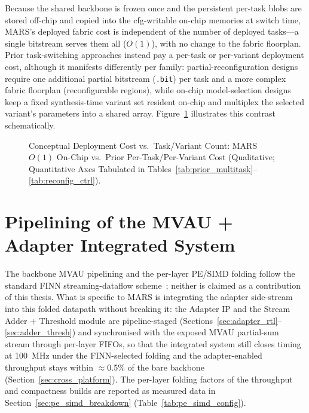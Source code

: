 \documentclass[12pt, a4paper]{report}
\numberwithin{equation}{chapter}
\numberwithin{figure}{chapter}
\numberwithin{table}{chapter}
\numberwithin{algorithm}{chapter}
\begin{document}
Because the shared backbone is frozen once and the persistent per-task blobs are stored off-chip and copied into the cfg-writable on-chip memories at switch time, MARS's deployed fabric cost is independent of the number of deployed tasks---a single bitstream serves them all ($O(1)$), with no change to the fabric floorplan. Prior task-switching approaches instead pay a per-task or per-variant deployment cost, although it manifests differently per family: partial-reconfiguration designs require one additional partial bitstream (\texttt{.bit}) per task and a more complex fabric floorplan (reconfigurable regions), while on-chip model-selection designs keep a fixed synthesis-time variant set resident on-chip and multiplex the selected variant's parameters into a shared array. Figure~\ref{fig:scaling_cost} illustrates this contrast schematically.

\begin{figure}[H]
\centering
{}
\caption[Conceptual Deployment Cost vs.\ Task/Variant Count]{Conceptual Deployment Cost vs.\ Task/Variant Count: MARS $O(1)$ On-Chip vs.\ Prior Per-Task/Per-Variant Cost (Qualitative; Quantitative Axes Tabulated in Tables~\ref{tab:prior_multitask}--\ref{tab:reconfig_ctrl}).}
\label{fig:scaling_cost}
\end{figure}

\section{Pipelining of the MVAU + Adapter Integrated System}
\label{sec:simd_pipeline}

The backbone MVAU pipelining and the per-layer PE/SIMD folding follow the standard FINN streaming-dataflow scheme~\cite{Umuroglu2017FINN, Blott2018FINNR}; neither is claimed as a contribution of this thesis. What is specific to MARS is integrating the adapter side-stream into this folded datapath without breaking it: the Adapter IP and the Stream Adder + Threshold module are pipeline-staged (Sections~\ref{sec:adapter_rtl}--\ref{sec:adder_thresh}) and synchronised with the exposed MVAU partial-sum stream through per-layer FIFOs, so that the integrated system still closes timing at 100~MHz under the FINN-selected folding and the adapter-enabled throughput stays within $\approx$0.5\% of the bare backbone (Section~\ref{sec:cross_platform}). The per-layer folding factors of the throughput and compactness builds are reported as measured data in Section~\ref{sec:pe_simd_breakdown} (Table~\ref{tab:pe_simd_config}).
\end{document}
